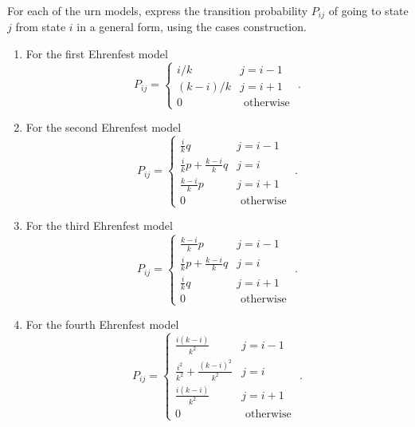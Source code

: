 \documentclass[12pt]{article}
\begin{document}
\begin{exercise}
    For each of the urn models, express the transition probability \( P_
    {ij} \) of going to state \( j \) from state \( i \) in a general
    form, using the cases construction.
\end{exercise}
\begin{solution}
    \begin{enumerate}[label=(\alph*)]
    \item
        For the first Ehrenfest model
        \[
            P_{ij} =
            \begin{cases}
                i/k & j = i-1 \\
                (k-i)/k & j = i+1 \\
                0 & \text{ otherwise }
            \end{cases}
            .
        \]
    \item
        For the second Ehrenfest model
        \[
            P_{ij} =
            \begin{cases}
                \frac{i}{k} q & j = i-1 \\
                \frac{i}{k} p + \frac{k-i}{k} q & j = i \\
                \frac{k-i}{k} p & j = i+1 \\
                0 & \text{ otherwise }
            \end{cases}
            .
        \]
    \item
        For the third Ehrenfest model
        \[
            P_{ij} =
            \begin{cases}
                \frac{k-i}{k} p & j = i-1 \\
                \frac{i}{k} p + \frac{k-i}{k} q & j = i \\
                \frac{i}{k} q & j = i+1 \\
                0 & \text{ otherwise }
            \end{cases}
            .
        \]
    \item
        For the fourth Ehrenfest model
        \[
            P_{ij} =
            \begin{cases}
                \frac{i(k-i)}{k^2} & j = i-1 \\
                \frac{i^2}{k^2} + \frac{(k-i)^2}{k^2} & j = i \\
                \frac{i(k-i)}{k^2} & j = i+1 \\
                0 & \text{ otherwise }
            \end{cases}
            .
        \]
\end{enumerate}
\end{solution}
\end{document}
